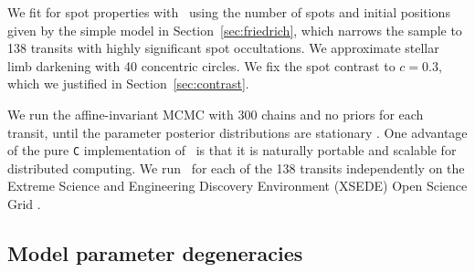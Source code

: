 We fit for spot properties with \stsp\ using the number of spots and initial positions given by the simple model in Section~\ref{sec:friedrich}, which narrows the sample to 138 transits with highly significant spot occultations. We approximate stellar limb darkening with 40 concentric circles. We fix the spot contrast to $c=0.3$, which we justified in Section~\ref{sec:contrast}.

We run the affine-invariant MCMC with 300 chains and no priors for each transit, until the parameter posterior distributions are stationary \citep{Goodman2010}. One advantage of the pure \texttt{C} implementation of \stsp\ is that it is naturally portable and scalable for distributed computing. We run \stsp\ for each of the 138 transits independently on the Extreme Science and Engineering Discovery Environment (XSEDE) Open Science Grid \citep{osg, xsede}. 


\subsection{Model parameter degeneracies}  \label{sec:degen}

